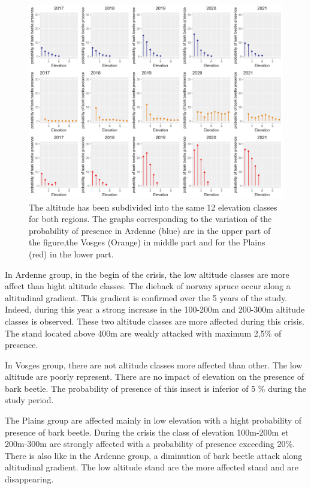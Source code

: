 \documentclass[3p,procedia]{elsarticle}
\begin{document}
\begin{figure}
\centering
	\includegraphics[width=\textwidth]{synthese_color_06_2022.png}
     \caption{The altitude has been subdivided into the same 12 elevation classes for both regions. 
The graphs corresponding to the variation of the probability of presence in Ardenne (blue) are in the upper part of the figure,the Vosges (Orange) in middle part and for the Plains (red) in the lower part.
}
	\label{alti_sco}
\end{figure}

In Ardenne group, in the begin of the crisis, the low altitude classes are more affect than hight altitude classes.
The dieback of norway spruce occur along a altitudinal  gradient.
This gradient is confirmed over the 5 years of the study.
Indeed, during this year a strong increase in the 100-200m and 200-300m altitude classes is observed. 
These two altitude classes are more affected during this crisis.
The stand located above 400m are weakly attacked with maximum 2,5\% of presence.

In Vosges group, there are not altitude classes more affected than other. 
The low altitude are poorly represent. There are no impact of elevation on the presence of bark beetle. 
The probability of presence of this insect is inferior of 5 \% during the study period.

The Plains group are affected mainly in low elevation with a hight probability of presence of bark beetle. 
During the crisis the class of elevation 100m-200m et 200m-300m are strongly affected with a probability of presence exceeding 20\%.
There is also like in the Ardenne group, a diminution of bark beetle attack along altitudinal gradient.
The low altitude stand are the more affected stand and are disappearing.
\end{document}

